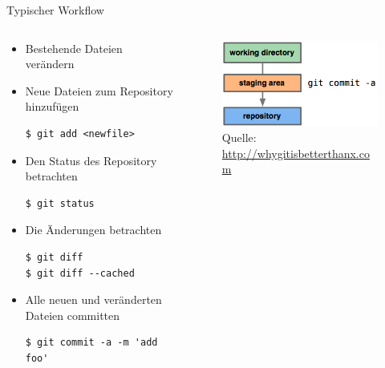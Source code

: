 \begin{frame}[fragile]{Typischer Workflow}
  \begin{columns}
    \begin{column}{0.7\textwidth}
      \begin{itemize}
        \item Bestehende Dateien verändern
        \item Neue Dateien zum Repository hinzufügen
        \begin{lstlisting}
$ git add <newfile>
        \end{lstlisting}
        \item Den Status des Repository betrachten
        \begin{lstlisting}
$ git status
        \end{lstlisting}
        \item Die Änderungen betrachten
        \begin{lstlisting}
$ git diff
$ git diff --cached
        \end{lstlisting}
        \item Alle neuen und veränderten Dateien committen
        \begin{lstlisting}
$ git commit -a -m 'add foo'
        \end{lstlisting}
      \end{itemize}
    \end{column}
    \begin{column}{0.35\textwidth}
      \begin{figure}
        \includegraphics[width=\textwidth]{img/commitall}
        \caption[format=empty]{Quelle: \url{http://whygitisbetterthanx.com}}
      \end{figure}
    \end{column}
  \end{columns}
\end{frame}

